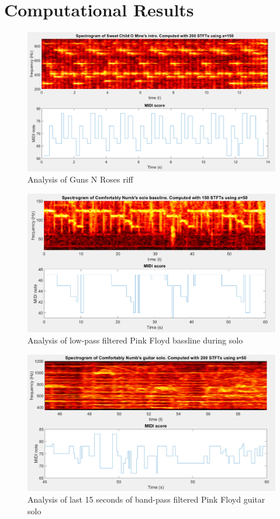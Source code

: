 \documentclass{article}
\begin{document}
\section{Computational Results}

\begin{figure}[!h]
	\centering
	\includegraphics[width=\linewidth]{figs/score_1}    	
	\caption{Analysis of Guns N Roses riff}
	\label{fig:spect1}
\end{figure}


\begin{figure}[!h]
	\centering
	\includegraphics[width=\linewidth]{figs/score_2}    	
	\caption{Analysis of low-pass filtered Pink Floyd bassline during solo}
	\label{fig:spect2}
\end{figure}

\begin{figure}[!t]
	\centering
	\includegraphics[width=\linewidth]{figs/score_3}    	
	\caption{Analysis of last 15 seconds of band-pass filtered Pink Floyd guitar solo}
	\label{fig:spect3}
\end{figure}
\end{document}
